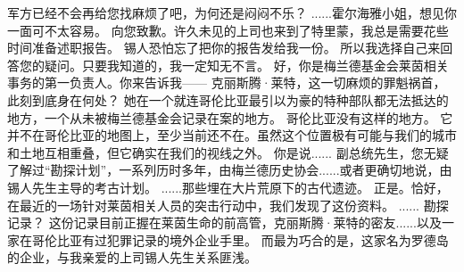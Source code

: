 \documentclass[openany]{book}
\begin{document}
\begin{dialogue}
     军方已经不会再给您找麻烦了吧，为何还是闷闷不乐？
     ......霍尔海雅小姐，想见你一面可不太容易。
     向您致歉。许久未见的上司也来到了特里蒙，我总是需要花些时间准备述职报告。
     锡人恐怕忘了把你的报告发给我一份。
     所以我选择自己来回答您的疑问。只要我知道的，我一定知无不言。
     好，你是梅兰德基金会莱茵相关事务的第一负责人。你来告诉我——
     克丽斯腾·莱特，这一切麻烦的罪魁祸首，此刻到底身在何处？
     她在一个就连哥伦比亚最引以为豪的特种部队都无法抵达的地方，一个从未被梅兰德基金会记录在案的地方。
     哥伦比亚没有这样的地方。
     它并不在哥伦比亚的地图上，至少当前还不在。虽然这个位置极有可能与我们的城市和土地互相重叠，但它确实在我们的视线之外。
     你是说......
     副总统先生，您无疑了解过“勘探计划”，一系列历时多年，由梅兰德历史协会......或者更确切地说，由锡人先生主导的考古计划。
     ......那些埋在大片荒原下的古代遗迹。
     正是。恰好，在最近的一场针对莱茵相关人员的突击行动中，我们发现了这份资料。
     ......
     勘探记录？
     这份记录目前正握在莱茵生命的前高管，克丽斯腾·莱特的密友......以及一家在哥伦比亚有过犯罪记录的境外企业手里。
     而最为巧合的是，这家名为罗德岛的企业，与我亲爱的上司锡人先生关系匪浅。
\end{dialogue}
\end{document}
